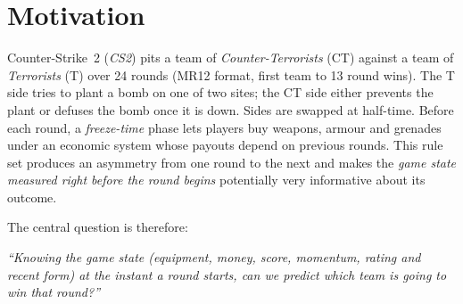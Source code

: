 \section{Motivation}
\label{sec:motivation}

Counter-Strike~2 (\emph{CS2}) pits a team of
\textit{Counter-Terrorists} (\textcolor{cs2ct}{CT}) against a team of
\textit{Terrorists} (\textcolor{cs2t}{T}) over 24 rounds (MR12 format,
first team to 13 round wins). The T side tries to plant a bomb on one
of two sites; the CT side either prevents the plant or defuses the
bomb once it is down. Sides are swapped at half-time. Before each
round, a \emph{freeze-time} phase lets players buy weapons, armour and
grenades under an economic system whose payouts depend on previous
rounds. This rule set produces an asymmetry from one round to the next
and makes the \emph{game state measured right before the round begins}
potentially very informative about its outcome.

The central question is therefore:

\begin{center}\itshape\small
``Knowing the game state (equipment, money, score, momentum, rating
and recent form) at the instant a round starts, can we predict which
team is going to win that round?''
\end{center}

